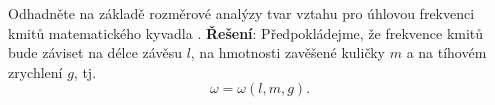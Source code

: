 \begin{mdframed}[style=mdexam]
  \begin{example}\label{fyz:exam024}
    Odhadněte na základě rozměrové analýzy tvar vztahu pro úhlovou frekvenci kmitů matematického 
    kyvadla \cite[s.~1]{Kulhanek2020}. \newline
    \textbf{Řešení}: Předpokládejme, že frekvence kmitů bude záviset na délce závěsu \(l\), na
    hmotnosti zavěšené kuličky \(m\) a na tíhovém zrychlení \(g\), tj.
    \begin{equation*}
      ω= ω(l, m, g).
    \end{equation*}

    {\centering
    \captionsetup{type=figure}  
    \label{fyz:fig925}
    \par}


\end{example}
\end{mdframed}
